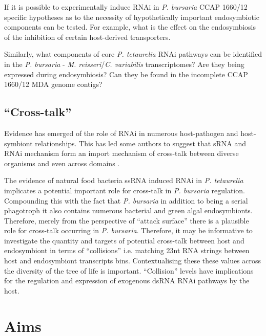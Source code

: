 If it is possible to experimentally induce RNAi in \textit{P. bursaria} CCAP 1660/12
specific hypotheses as to the necessity of hypothetically important
endosymbiotic components can be tested. For example, what is the effect
on the endosymbiosis of the inhibition of certain host-derived transporters.

Similarly, what components of core \textit{P. tetaurelia} RNAi pathways
can be identified 
in the \textit{P. bursaria} - \textit{M. reisseri}/\textit{C. variabilis} transcriptomes?
Are they being expressed during endosymbiosis?  Can they be found in the incomplete
CCAP 1660/12 MDA genome contigs?

\subsection{``Cross-talk''}

Evidence has emerged of the role of RNAi in numerous host-pathogen 
\citep{Nowara2010,LaMonte2012,Weiberg2013,Buck2014}
and host-symbiont \citep{Helber2011,Koch2013} relationships.
This has led some authors to suggest that sRNA and RNAi mechanism form an import
mechanism of cross-talk between diverse organisms and even across
domains \citep{Liang2013,Knip2014,Weiberg2015}.

The evidence of natural food bacteria ssRNA induced RNAi in \textit{P. tetaurelia}
\citep{Carradec2015} implicates a potential important role for cross-talk
in \textit{P. bursaria} regulation. Compounding this with the fact
that \textit{P. bursaria} in addition to being a serial phagotroph
it also contains numerous bacterial and green algal endosymbionts.
Therefore, merely from the perspective of ``attack surface'' there is a plausible
role for cross-talk occurring in \textit{P. bursaria}.   Therefore, 
it may be informative to investigate the quantity and targets of
potential cross-talk between host and endosymbiont in terms of 
``collisions''  i.e. matching 23nt RNA strings between host and endosymbiont
transcripts bins.   Contextualising these these values 
across the diversity of the tree of life is important.
``Collision'' levels have implications for the regulation and expression of exogenous dsRNA
RNAi pathways by the host. 


\section{Aims}

